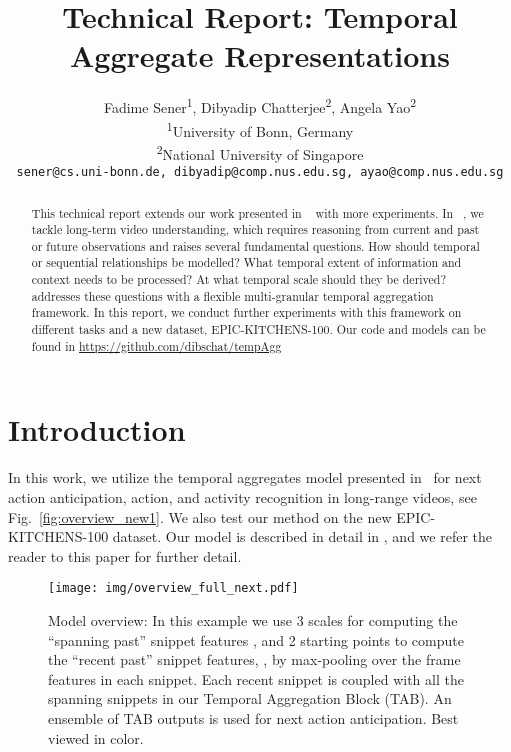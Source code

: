 \documentclass[10pt,twocolumn,letterpaper]{article}
\begin{document}
 
\title{Technical Report: Temporal Aggregate Representations}

\author{Fadime Sener\textsuperscript{1}, Dibyadip Chatterjee\textsuperscript{2}, Angela Yao\textsuperscript{2}\\
\textsuperscript{1}University of Bonn, Germany \\
\textsuperscript{2}National University of Singapore \\
{\tt\small sener@cs.uni-bonn.de, dibyadip@comp.nus.edu.sg, ayao@comp.nus.edu.sg} 
}

\maketitle 

\begin{abstract}

This technical report extends our work presented in ~\cite{sener2020temporal} with more experiments.
In ~\cite{sener2020temporal}, we tackle long-term video understanding, which requires reasoning from current and past or future observations and raises several fundamental questions.
How should temporal or sequential relationships be modelled?
What temporal extent of information and context needs to be processed? 
At what temporal scale should they be derived?
~\cite{sener2020temporal} addresses these questions with a flexible multi-granular temporal aggregation framework.
In this report, we conduct further experiments with this framework on different tasks and a new dataset, EPIC-KITCHENS-100. 
Our code and models can be found in {\url{https://github.com/dibschat/tempAgg}} 

\end{abstract}

\section{Introduction}
In this work, we utilize the temporal aggregates model presented in~\cite{sener2020temporal} for next action anticipation, action, and activity recognition in long-range videos, see Fig.~\ref{fig:overview_new1}. 
We also test our method on the new EPIC-KITCHENS-100 dataset. 
Our model is described in detail in \cite{sener2020temporal}, and we refer the reader to this paper for further detail.


\begin{figure} 
\centering 
 \texttt{[image: img/overview\_full\_next.pdf]}
\caption{
Model overview: In this example we use 3 scales for computing the ``spanning past'' snippet features , and 2 starting points to compute the ``recent past'' snippet features, , by max-pooling over the frame features in each snippet. 
Each recent snippet is coupled with all the spanning snippets in our Temporal Aggregation Block (TAB). 
An ensemble of TAB outputs is used for next action anticipation. 
Best viewed in color.
}
\label{fig:overview_new}
\end{figure}
\end{document}

